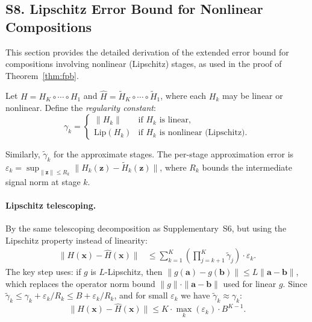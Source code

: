 \subsection*{S8. Lipschitz Error Bound for Nonlinear Compositions}
\label{sec:supp_lipschitz}

This section provides the detailed derivation of the extended error bound for compositions involving nonlinear (Lipschitz) stages, as used in the proof of Theorem~\ref{thm:fpb}.

Let $H = H_K \circ \cdots \circ H_1$ and $\hat{H} = \tilde{H}_K \circ \cdots \circ \tilde{H}_1$, where each $H_k$ may be linear or nonlinear. Define the \emph{regularity constant}:
\[
  \gamma_k = \begin{cases} \|H_k\| & \text{if } H_k \text{ is linear}, \\ \mathrm{Lip}(H_k) & \text{if } H_k \text{ is nonlinear (Lipschitz)}. \end{cases}
\]

Similarly, $\tilde{\gamma}_k$ for the approximate stages. The per-stage approximation error is $\varepsilon_k = \sup_{\|\mathbf{z}\| \leq R_k} \|H_k(\mathbf{z}) - \tilde{H}_k(\mathbf{z})\|$, where $R_k$ bounds the intermediate signal norm at stage $k$.

\paragraph{Lipschitz telescoping.}
By the same telescoping decomposition as Supplementary~S6, but using the Lipschitz property instead of linearity:
\begin{align}
  \|H(\mathbf{x}) - \hat{H}(\mathbf{x})\|
  &\leq \sum_{k=1}^{K} \left(\prod_{j=k+1}^{K} \tilde{\gamma}_j\right) \cdot \varepsilon_k.
\end{align}
The key step uses: if $g$ is $L$-Lipschitz, then $\|g(\mathbf{a}) - g(\mathbf{b})\| \leq L \|\mathbf{a} - \mathbf{b}\|$, which replaces the operator norm bound $\|g\| \cdot \|\mathbf{a} - \mathbf{b}\|$ used for linear $g$. Since $\tilde{\gamma}_k \leq \gamma_k + \varepsilon_k/R_k \leq B + \varepsilon_k/R_k$, and for small $\varepsilon_k$ we have $\tilde{\gamma}_k \approx \gamma_k$:
\begin{equation}
  \|H(\mathbf{x}) - \hat{H}(\mathbf{x})\| \leq K \cdot \max_k(\varepsilon_k) \cdot B^{K-1}.
\end{equation}

